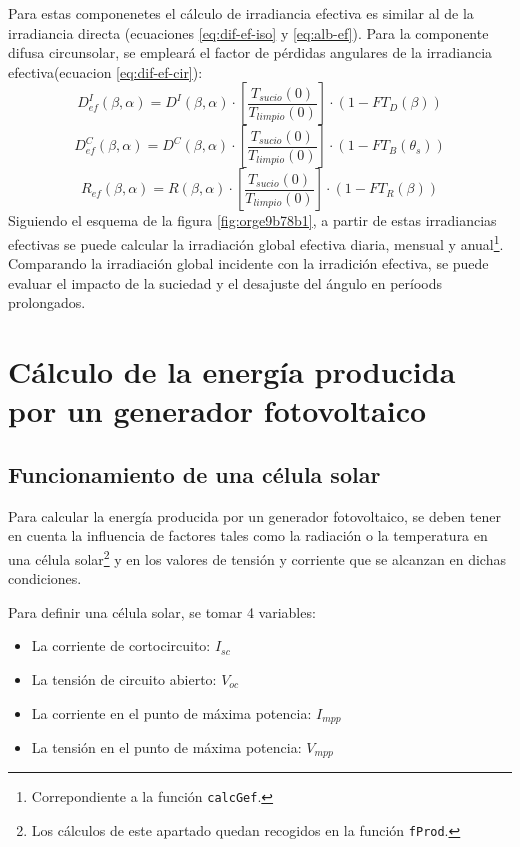 Para estas componenetes el cálculo de irradiancia efectiva es similar al de la irradiancia directa (ecuaciones \ref{eq:dif-ef-iso} y \ref{eq:alb-ef}). Para la componente difusa circunsolar, se empleará el factor de pérdidas angulares de la irradiancia efectiva(ecuacion \ref{eq:dif-ef-cir}):
\begin{equation}
D_{ef}^I(\beta ,\alpha)=D^I(\beta ,\alpha)\cdot[\frac{T_{sucio}(0)}{T_{limpio}(0)}]\cdot (1-FT_D(\beta))
\label{eq:dif-ef-iso}
\end{equation}
\begin{equation}
D_{ef}^C(\beta ,\alpha)=D^C(\beta ,\alpha)\cdot[\frac{T_{sucio}(0)}{T_{limpio}(0)}]\cdot (1-FT_B(\theta_s))
\label{eq:dif-ef-cir}
\end{equation}
\begin{equation}
R_{ef}(\beta ,\alpha)=R(\beta ,\alpha)\cdot[\frac{T_{sucio}(0)}{T_{limpio}(0)}]\cdot (1-FT_R(\beta))
\label{eq:alb-ef}
\end{equation}
Siguiendo el esquema de la figura \ref{fig:orge9b78b1}, a partir de estas irradiancias efectivas se puede calcular la irradiación global efectiva diaria, mensual y anual\footnote{Correpondiente a la función \texttt{calcGef}.}. Comparando la irradiación global incidente con la irradición efectiva, se puede evaluar el impacto de la suciedad y el desajuste del ángulo en períoods prolongados.

\section{Cálculo de la energía producida por un generador fotovoltaico}
\label{sec:orga8c4189}
\label{sec:calculo-energia-producida-generador}

\subsection{Funcionamiento de una célula solar}
\label{sec:org77b6a92}
\label{subsec:funcionamiento-celula-solar}
Para calcular la energía producida por un generador fotovoltaico, se deben tener en cuenta la influencia de factores tales como la radiación o la temperatura en una célula solar\footnote{Los cálculos de este apartado quedan recogidos en la función \texttt{fProd}.} y en los valores de tensión y corriente que se alcanzan en dichas condiciones.

Para definir una célula solar, se tomar 4 variables:
\begin{itemize}
\item La corriente de cortocircuito: \(I_{sc}\)
\item La tensión de circuito abierto: \(V_{oc}\)
\item La corriente en el punto de máxima potencia: \(I_{mpp}\)
\item La tensión en el punto de máxima potencia: \(V_{mpp}\)
\end{itemize}

